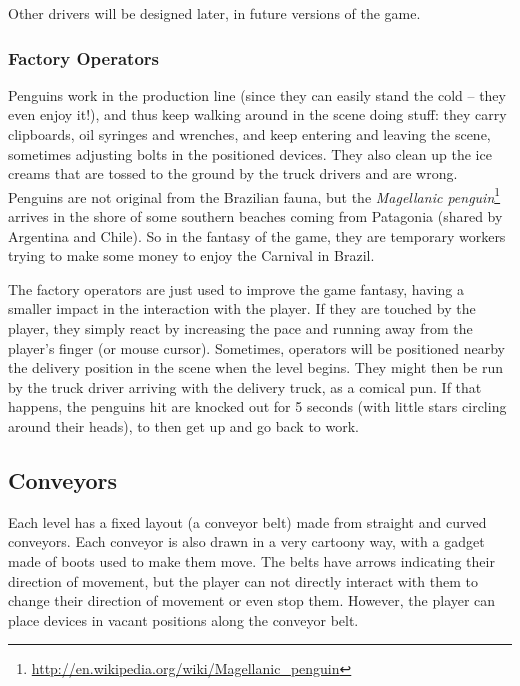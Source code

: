 \documentclass[a4paper]{scrartcl}
\begin{document}
            Other drivers will be designed later, in future versions of the game.

        \subsubsection{Factory Operators}
            Penguins work in the production line (since they can easily stand
            the cold -- they even enjoy it!), and thus keep walking around in
            the scene doing stuff: they carry clipboards, oil syringes and
            wrenches, and keep entering and leaving the scene, sometimes
            adjusting bolts in the positioned devices. They also clean up the
            ice creams that are tossed to the ground by the truck drivers and
            are wrong. Penguins are not original from the Brazilian fauna, but
            the \textit{Magellanic penguin}\footnote{\url{http://en.wikipedia.org/wiki/Magellanic_penguin}}
            arrives in the shore of some southern beaches coming from Patagonia
            (shared by Argentina and Chile). So in the fantasy of the game, they
            are temporary workers trying to make some money to enjoy the
            Carnival in Brazil.

            The factory operators are just used to improve the game fantasy,
            having a smaller impact in the interaction with the player. If they
            are touched by the player, they simply react by increasing the pace
            and running away from the player's finger (or mouse cursor).
            Sometimes, operators will be positioned nearby the delivery position
            in the scene when the level begins. They might then be run by the
            truck driver arriving with the delivery truck, as a comical pun. If
            that happens, the penguins hit are knocked out for 5 seconds (with
            little stars circling around their heads), to then get up and go
            back to work.

    \subsection{Conveyors}
        Each level has a fixed layout (a conveyor belt) made from straight and
        curved conveyors. Each conveyor is also drawn in a very cartoony way,
        with a gadget made of boots used to make them move. The belts have
        arrows indicating their direction of movement, but the player can not
        directly interact with them to change their direction of movement or
        even stop them. However, the player can place devices in vacant
        positions along the conveyor belt.
\end{document}
